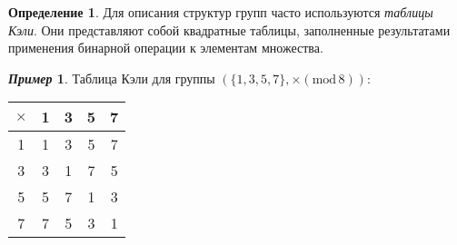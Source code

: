 \documentclass[a4paper, 14pt]{extarticle}
\newcommand{\n}{\par}
\renewcommand{\mod}{\mathrm{mod} \,}
\theoremstyle{definition}
\newtheorem*{exmpl*}{\textit{Пример}}
\newtheorem{definition}{Определение}
\theoremstyle{plain}
\numberwithin{theorem}{section}
\numberwithin{definition}{section}
\numberwithin{statement}{section}
\numberwithin{lemma}{section}
\numberwithin{consequence}{section}
\begin{document}
	\begin{definition}
		Для описания структур групп часто используются \textit{таблицы Кэли}. Они представляют собой квадратные таблицы, заполненные результатами применения бинарной операции к элементам множества.
	\end{definition}
	\begin{exmpl*}
		Таблица Кэли для группы $(\{1, 3, 5, 7\}, \times (\mod 8)){:}$
		\begin{center}
			\begin{tabular}{c|cccc}
				$\times$ & 1 & 3 & 5 & 7\\
				\hline
				1 & 1 & 3 & 5 & 7\\
				
				3 & 3 & 1 & 7 & 5\\
				
				5 & 5 & 7 & 1 & 3\\
				
				7 & 7 & 5 & 3 & 1\\
			\end{tabular}
		\end{center} \n
	\end{exmpl*}
	\newpage
\end{document}
